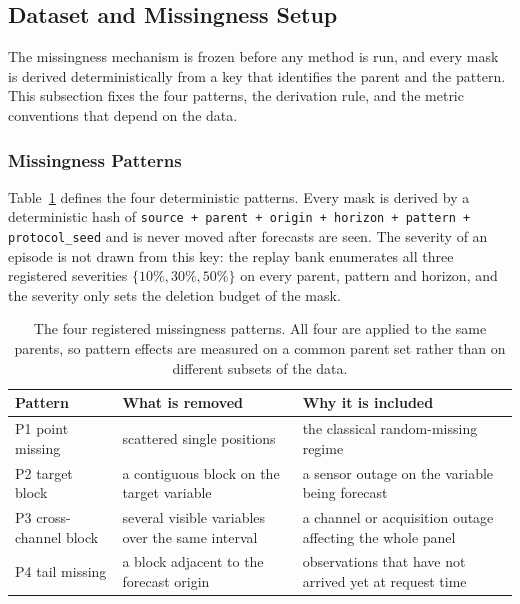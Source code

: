 \documentclass{article}
\begin{document}
\subsection{Dataset and Missingness Setup}
\label{app:data-protocol}
The missingness mechanism is frozen before any method is run, and every mask is derived
deterministically from a key that identifies the parent and the pattern. This subsection fixes
the four patterns, the derivation rule, and the metric conventions that depend on the data.

\subsubsection{Missingness Patterns}
\label{app:patterns}
Table~\ref{tab:app-patterns} defines the four deterministic patterns. Every mask is derived
by a deterministic hash of
\texttt{source + parent + origin + horizon + pattern + protocol\_seed} and is never moved
after forecasts are seen. The severity of an episode is not drawn from this key: the replay
bank enumerates all three registered severities $\{10\%, 30\%, 50\%\}$ on every parent,
pattern and horizon, and the severity only sets the deletion budget of the mask.

\begin{table}[!t]
  \caption{The four registered missingness patterns. All four are applied to the same parents,
  so pattern effects are measured on a common parent set rather than on different subsets of
  the data.}
  \label{tab:app-patterns}
  \centering
  \small
  \setlength{\tabcolsep}{4pt}
\begin{tabular}{@{}l p{} p{}@{}}
    \toprule
    Pattern & What is removed & Why it is included \\
    \midrule
    P1 point missing    & scattered single positions & the classical random-missing regime \\
    P2 target block     & a contiguous block on the target variable & a sensor outage on the variable being forecast \\
    P3 cross-channel block     & several visible variables over the same interval & a channel or acquisition outage affecting the whole panel \\
    P4 tail missing     & a block adjacent to the forecast origin & observations that have not arrived yet at request time \\
    \bottomrule
  \end{tabular}
\end{table}
\end{document}

